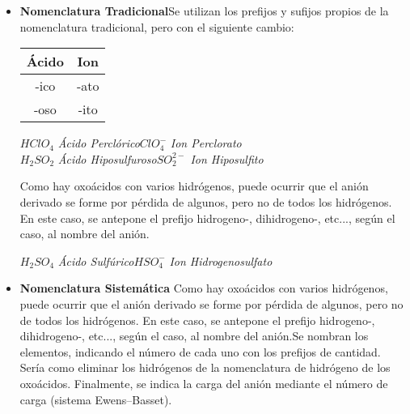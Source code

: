 \documentclass[11pt,fleqn]{book} %
\begin{document}
\begin{itemize}
	\item\textbf{Nomenclatura Tradicional}Se utilizan los prefijos y sufijos propios de la nomenclatura tradicional, pero con el siguiente cambio:
	\begin{table}[h!]
		\centering
		\begin{tabular}{c|c}
			Ácido&Ion\\ \hline
			-ico&-ato\\
			-oso&-ito\\ \hline
		\end{tabular}
	\end{table}

\begin{center}
	$HClO_4$ \hspace{0.3cm}\textit{Ácido Perclórico}\hspace{1cm}$ClO_{4}^{-}$ \hspace{0.3cm} \textit{Ion Perclorato}\\
	$H_2SO_2$ \hspace{0.3cm}\textit{Ácido Hiposulfuroso}\hspace{1cm}$SO_{2}^{2-}$ \hspace{0.3cm} \textit{Ion Hiposulfito}\\
\end{center}
	Como hay oxoácidos con varios hidrógenos, puede ocurrir que el anión derivado se forme por pérdida de algunos, pero no de todos los hidrógenos. En este caso, se antepone el prefijo hidrogeno-, dihidrogeno-, etc..., según el caso, al nombre del anión.	
\begin{center}
	$H_2SO_4$ \hspace{0.3cm}\textit{Ácido Sulfúrico}\hspace{1cm}$HSO_{4}^{-}$ \hspace{0.3cm} \textit{Ion Hidrogenosulfato}\\
\end{center}
	\item\textbf{Nomenclatura Sistemática} Como hay oxoácidos con varios hidrógenos, puede ocurrir que el anión derivado se forme por pérdida de algunos, pero no de todos los hidrógenos. En este caso, se antepone el prefijo hidrogeno-, dihidrogeno-, etc..., según el caso, al nombre del anión.Se nombran los elementos, indicando el número de cada uno con los prefijos de cantidad. Sería como eliminar los hidrógenos de la nomenclatura de hidrógeno de los oxoácidos. Finalmente, se indica la carga del anión mediante el número de carga (sistema Ewens–Basset).

\end{itemize}
\end{document}
